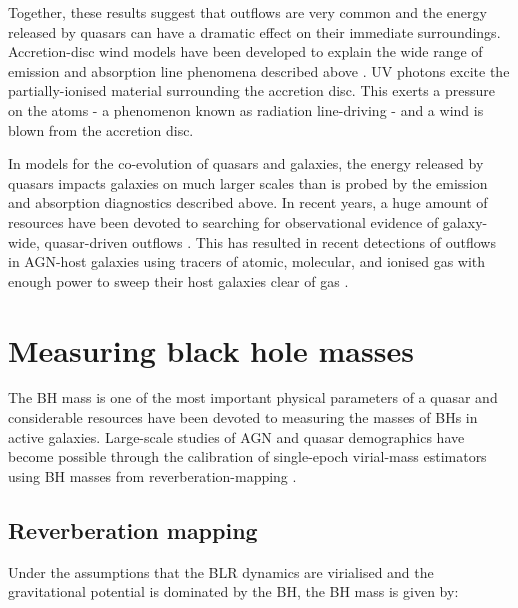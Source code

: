 Together, these results suggest that outflows are very common and the energy released by quasars can have a dramatic effect on their immediate surroundings. 
Accretion-disc wind models have been developed to explain the wide range of emission and absorption line phenomena described above \citep[e.g.][]{murray95,elvis00,proga00,everett05}.
UV photons excite the partially-ionised material surrounding the accretion disc. 
This exerts a pressure on the atoms - a phenomenon known as radiation line-driving - and a wind is blown from the accretion disc. 
  
In models for the co-evolution of quasars and galaxies, the energy released by quasars impacts galaxies on much larger scales than is probed by the emission and absorption diagnostics described above.  
In recent years, a huge amount of resources have been devoted to searching for observational evidence of galaxy-wide, quasar-driven outflows \citep[for recent reviews, see][]{alexander12,fabian12,heckman14}.
This has resulted in recent detections of outflows in AGN-host galaxies using tracers of atomic, molecular, and ionised gas with enough power to sweep their host galaxies clear of gas \citep[e.g.][]{nesvadba06,arav08,nesvadba08,moe09,dunn10,alexander10,harrison12,harrison14,nesvadba10,rupke13,veilleux13,nardini15,feruglio10,alatalo11,cimatti13,cicone14}.  

\section{Measuring black hole masses}

The BH mass is one of the most important physical parameters of a quasar and considerable resources have been devoted to measuring the masses of BHs in active galaxies. 
Large-scale studies of AGN and quasar demographics have become possible through the calibration of single-epoch virial-mass estimators using BH masses from reverberation-mapping \citep[e.g.][]{peterson10,vestergaard11,marziani12,shen13}.  

\subsection{Reverberation mapping}

Under the assumptions that the BLR dynamics are virialised  and the gravitational potential is dominated by the BH, the BH mass is given by:

